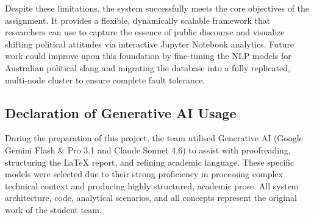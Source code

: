 Despite these limitations, the system successfully meets the core objectives of the assignment. It provides a flexible, dynamically scalable framework that researchers can use to capture the essence of public discourse and visualize shifting political attitudes via interactive Jupyter Notebook analytics. Future work could improve upon this foundation by fine-tuning the NLP models for Australian political slang and migrating the database into a fully replicated, multi-node cluster to ensure complete fault tolerance.

\subsection*{Declaration of Generative AI Usage}
During the preparation of this project, the team utilised Generative AI (Google Gemini Flash \& Pro 3.1 and Claude Sonnet 4.6) to assist with proofreading, structuring the LaTeX report, and refining academic language. These specific models were selected due to their strong proficiency in processing complex technical context and producing highly structured, academic prose. All system architecture, code, analytical scenarios, and all concepts represent the original work of the student team.
